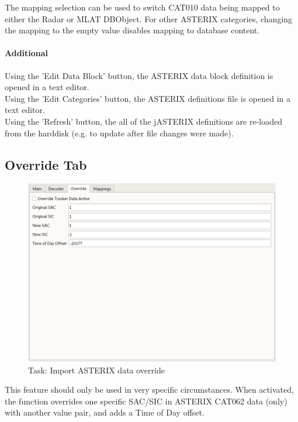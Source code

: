 The mapping selection can be used to switch CAT010 data being mapped to either the Radar or MLAT DBObject. For other ASTERIX categories, changing the mapping to the empty value disables mapping to database content.

\paragraph{Additional}

Using the 'Edit Data Block' button, the ASTERIX data block definition is opened in a text editor. \\

Using the 'Edit Categories' button, the ASTERIX definitions file is opened in a text editor. \\

Using the 'Refresh' button, the all of the jASTERIX definitions are re-loaded from the harddisk (e.g. to update after file changes were made). \\

\subsection{Override Tab}
\label{sec:task_import_asterix_override}


\begin{figure}[H]
  \center
    \includegraphics[width=16cm,frame]{figures/asterix_import_data_override.png}
  \caption{Task: Import ASTERIX data override}
\end{figure}

This feature should only be used in very specific circumstances. When activated, the function overrides one specific SAC/SIC in ASTERIX CAT062 data (only) with another value pair, and adds a Time of Day offset. \\

